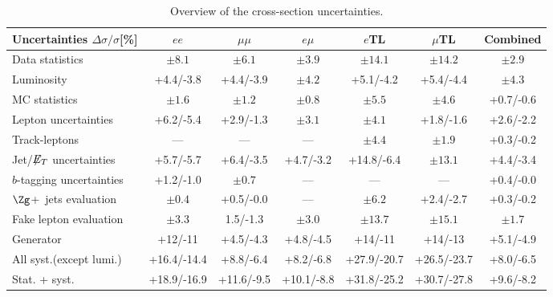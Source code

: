 %
\begin{table*}[htb]
\begin{footnotesize}
\begin{adjustwidth}{-6em}{-6em}
\centering
\begin{tabular}{|l|c|c|c|c|c|c|}
\hline
           Uncertainties       $\Delta\sigma/\sigma$[\%]        & $ee$              & $\mu\mu$          & $e\mu$            &  $e$TL  & $\mu$TL   &Combined         \\ \hline


Data statistics           &    $\pm 8.1$  &    $\pm 6.1$  &    $\pm 3.9$  &   $\pm 14.1$  &   $\pm 14.2$  &    $\pm 2.9$\\
\hline
Luminosity                &    +4.4/-3.8 &    +4.4/-3.9  &    $\pm 4.2$  &    +5.1/-4.2  &    +5.4/-4.4  &    $\pm 4.3$ \\
\hline
MC statistics             &    $\pm 1.6$  &    $\pm 1.2$  &    $\pm 0.8$  &    $\pm 5.5$  &    $\pm 4.6$  &    +0.7/-0.6 \\
Lepton uncertainties      &    +6.2/-5.4   &    +2.9/-1.3  &    $\pm 3.1$  &    $\pm 4.1$  &    +1.8/-1.6  &    +2.6/-2.2 \\
Track-leptons             &     ---          &    ---          & ---          &    $\pm 4.4$  &    $\pm 1.9$  &    +0.3/-0.2 \\
Jet/$\not\!\!{E_{T}}$ uncertainties  &    +5.7/-5.7  &    +6.4/-3.5  & +4.7/-3.2  &    +14.8/-6.4  &   $\pm 13.1$  &    +4.4/-3.4 \\
$b$-tagging uncertainties &    +1.2/-1.0  &    $\pm 0.7$   &     ---          &     ---          &     ---          &    +0.4/-0.0 \\
$\Zg$+~jets evaluation    &    $\pm 0.4$  &    +0.5/-0.0  &      --- &    $\pm 6.2$  &    +2.4/-2.7  &    +0.3/-0.2 \\
Fake lepton evaluation    &    $\pm 3.3$  &    1.5/-1.3  &    $\pm 3.0$  &   $\pm 13.7$  &   $\pm 15.1$  &    $\pm 1.7$  \\
Generator                 &   +12/-11     &    +4.5/-4.3   &    +4.8/-4.5   &   +14/-11    &   +14/-13     &    +5.1/-4.9  \\
\hline
All syst.(except lumi.)    &   +16.4/-14.4  &    +8.8/-6.4  &    +8.2/-6.8  &   +27.9/-20.7  &   +26.5/-23.7   &    +8.0/-6.5 \\
\hline \hline
Stat. + syst.              &   +18.9/-16.9  &    +11.6/-9.5  &    +10.1/-8.8  &   +31.8/-25.2  &   +30.7/-27.8  &    +9.6/-8.2  \\
\hline

\end{tabular}
\caption{Overview of the \ttbar{} cross-section uncertainties.}
\label{tab:syssum}
\end{adjustwidth}
\end{footnotesize}
\end{table*}


